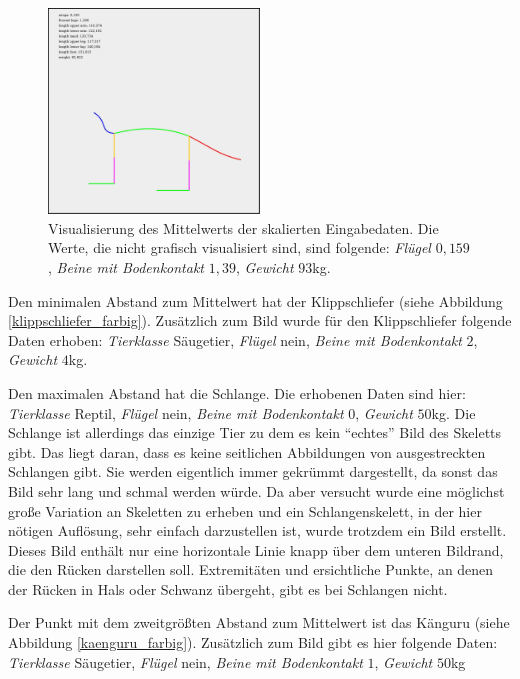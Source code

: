  \begin{figure}
  \centering
  \includegraphics[width=0.5\textwidth]{../PCA/mean_log_weight_downscaled_wings_legs_and_weight(onlyBox,stroke4).jpg}
  \caption{Visualisierung des Mittelwerts der skalierten Eingabedaten. Die Werte, die nicht grafisch visualisiert sind, sind folgende: \emph{Flügel} $0,159$, \emph{Beine mit Bodenkontakt} $1,39$, \emph{Gewicht} $93$kg.}
  \label{mean}
 \end{figure}
 
 Den minimalen Abstand zum Mittelwert hat der Klippschliefer (siehe Abbildung \ref{klippschliefer_farbig}). Zusätzlich zum Bild wurde für den Klippschliefer folgende Daten erhoben:
 \emph{Tierklasse} Säugetier, \emph{Flügel} nein, \emph{Beine mit Bodenkontakt} $2$, \emph{Gewicht} $4$kg.
 
 Den maximalen Abstand hat die Schlange. Die erhobenen Daten sind hier:
 \emph{Tierklasse} Reptil, \emph{Flügel} nein, \emph{Beine mit Bodenkontakt} $0$, \emph{Gewicht} $50$kg.
 Die Schlange ist allerdings das einzige Tier zu dem es kein "`echtes"' Bild des Skeletts gibt. Das liegt daran, dass es keine seitlichen Abbildungen von ausgestreckten Schlangen gibt. Sie werden eigentlich immer gekrümmt dargestellt, da sonst das Bild sehr lang und schmal werden würde. 
 Da aber versucht wurde eine möglichst große Variation an Skeletten zu erheben und ein Schlangenskelett, in der hier nötigen Auflösung, sehr einfach darzustellen ist, wurde trotzdem ein Bild erstellt. Dieses Bild enthält nur eine horizontale Linie knapp über dem unteren Bildrand, die den Rücken darstellen soll. Extremitäten und ersichtliche Punkte, an denen der Rücken in Hals oder Schwanz übergeht, gibt es bei Schlangen nicht.
 
 Der Punkt mit dem zweitgrößten Abstand zum Mittelwert ist das Känguru (siehe Abbildung \ref{kaenguru_farbig}). Zusätzlich zum Bild gibt es hier folgende Daten:
  \emph{Tierklasse} Säugetier, \emph{Flügel} nein, \emph{Beine mit Bodenkontakt} $1$, \emph{Gewicht} $50$kg
  
